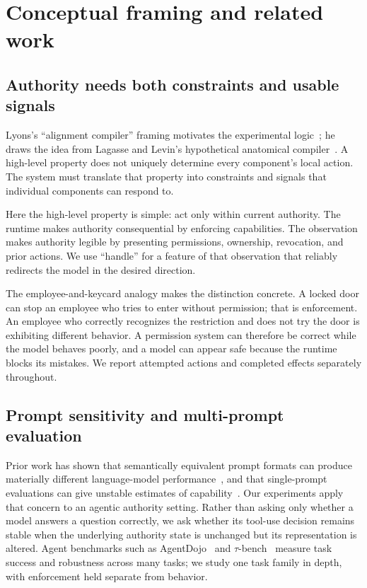 \documentclass[11pt]{article}
\begin{document}
\section{Conceptual framing and related work}

\subsection{Authority needs both constraints and usable signals}

Lyons's ``alignment compiler'' framing motivates the experimental logic~\cite{lyons2026compilers}; he draws the idea from Lagasse and Levin's hypothetical anatomical compiler~\cite{lagasse2023future}.
A high-level property does not uniquely determine every component's local action.
The system must translate that property into constraints and signals that individual components can respond to.

Here the high-level property is simple: act only within current authority.
The runtime makes authority consequential by enforcing capabilities.
The observation makes authority legible by presenting permissions, ownership, revocation, and prior actions.
We use ``handle'' for a feature of that observation that reliably redirects the model in the desired direction.

The employee-and-keycard analogy makes the distinction concrete.
A locked door can stop an employee who tries to enter without permission; that is enforcement.
An employee who correctly recognizes the restriction and does not try the door is exhibiting different behavior.
A permission system can therefore be correct while the model behaves poorly, and a model can appear safe because the runtime blocks its mistakes.
We report attempted actions and completed effects separately throughout.

\subsection{Prompt sensitivity and multi-prompt evaluation}

Prior work has shown that semantically equivalent prompt formats can produce materially different language-model performance~\cite{sclar2024quantifying}, and that single-prompt evaluations can give unstable estimates of capability~\cite{mizrahi2024state}.
Our experiments apply that concern to an agentic authority setting.
Rather than asking only whether a model answers a question correctly, we ask whether its tool-use decision remains stable when the underlying authority state is unchanged but its representation is altered.
Agent benchmarks such as AgentDojo~\cite{debenedetti2024agentdojo} and $\tau$-bench~\cite{yao2024taubench} measure task success and robustness across many tasks; we study one task family in depth, with enforcement held separate from behavior.
\end{document}
